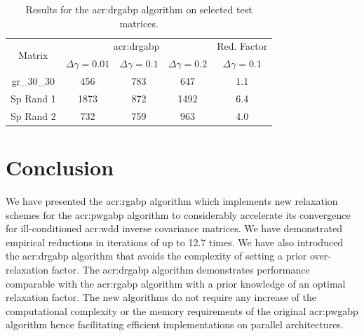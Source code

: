 \begin{table}[h]
	\centering
	\begin{threeparttable}[c]
		\caption{Results for the \acrshort{acr:drgabp} algorithm on selected test matrices.}
		\label{tbl:testmatrices_DRGaBP}
		\centering
		\begin{tabular}{ccccc}
			\toprule
			\multirow{2}{*}{Matrix} & \multicolumn{3}{c}{\gls{acr:drgabp}} & Red. Factor\tabularnewline
			\cline{2-4} 
			& $\Delta\gamma=0.01$ & $\Delta\gamma=0.1$ & $\Delta\gamma=0.2$ & $\Delta\gamma=0.1$\tabularnewline
			\midrule 
			gr\_30\_30 \cite{bib:matrixMarket} & 456 & 783 & 647 & 1.1\tabularnewline
			Sp Rand 1 & 1873 & 872 & 1492 & 6.4\tabularnewline
			Sp Rand 2 & 732 & 759 & 963 & 4.0\tabularnewline
			\bottomrule
		\end{tabular}
	\end{threeparttable}
\end{table}


\section{Conclusion}
We have presented the \gls{acr:rgabp} algorithm which implements new relaxation schemes for the \gls{acr:pwgabp} algorithm to considerably accelerate its convergence for ill-conditioned \gls{acr:wdd} inverse covariance matrices.
We have demonstrated empirical reductions in iterations of up to 12.7 times.
We have also introduced the \gls{acr:drgabp} algorithm that avoids the complexity of setting a prior over-relaxation factor.
The \gls{acr:drgabp} algorithm demonstrates performance comparable with the \gls{acr:rgabp} algorithm with a prior knowledge of an optimal relaxation factor.
The new algorithms do not require any increase of the computational complexity or the memory requirements of the original \gls{acr:pwgabp} algorithm hence facilitating efficient implementations on parallel architectures.


